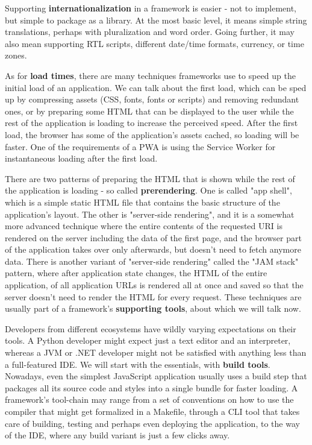 \documentclass[english,odsaz]{fitthesis}
\begin{document}
Supporting \textbf{internationalization} in a framework is easier - not to implement, but
simple to package as a library. At the most basic level, it means simple string
translations, perhaps with pluralization and word order. Going further, it may
also mean supporting RTL scripts, different date/time formats, currency, or time
zones.

As for \textbf{load times}, there are many techniques frameworks use to speed up the
initial load of an application. We can talk about the first load, which can be
sped up by compressing assets (CSS, fonts, fonts or scripts) and removing
redundant ones, or by preparing some HTML that can be displayed to the user
while the rest of the application is loading to increase the perceived
speed. After the first load, the browser has some of the application's assets
cached, so loading will be faster. One of the requirements of a PWA is using the
Service Worker for instantaneous loading after the first load.

There are two patterns of preparing the HTML that is shown while the rest of the
application is loading - so called \textbf{prerendering}. One is called "app shell",
which is a simple static HTML file that contains the basic structure of the
application's layout. The other is "server-side rendering", and it is a somewhat
more advanced technique where the entire contents of the requested URI is
rendered on the server including the data of the first page, and the browser
part of the application takes over only afterwards, but doesn't need to fetch
anymore data. There is another variant of "server-side rendering" called the
"JAM stack" pattern, where after application state changes, the HTML of the
entire application, of all application URLs is rendered all at once and saved so
that the server doesn't need to render the HTML for every request. These
techniques are usually part of a framework's \textbf{supporting tools}, about which we
will talk now.

Developers from different ecosystems have wildly varying expectations on their
tools. A Python developer might expect just a text editor and an interpreter,
whereas a JVM or .NET developer might not be satisfied with anything less than a
full-featured IDE. We will start with the essentials, with \textbf{build
tools}. Nowadays, even the simplest JavaScript application usually uses a build
step that packages all its source code and styles into a single bundle for
faster loading. A framework's tool-chain may range from a set of conventions on
how to use the compiler that might get formalized in a Makefile, through a CLI
tool that takes care of building, testing and perhaps even deploying the
application, to the way of the IDE, where any build variant is just a few clicks
away.
\end{document}
